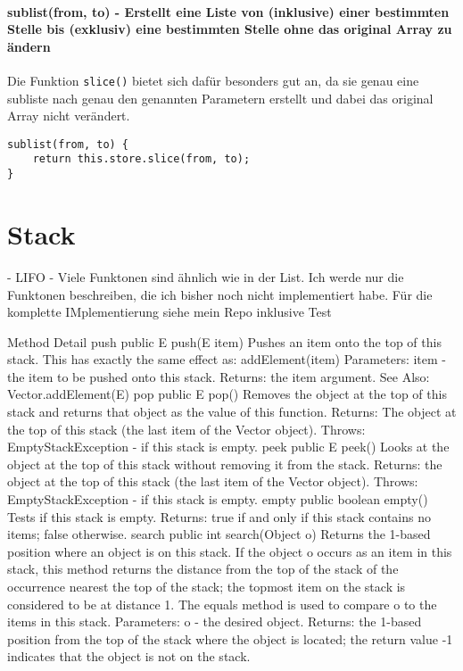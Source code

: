 \documentclass{book}
\begin{document}
\paragraph{sublist(from, to) - Erstellt eine Liste von (inklusive) einer bestimmten Stelle bis (exklusiv) eine bestimmten Stelle ohne das original Array zu ändern} Die Funktion \lstinline|slice()| bietet sich dafür besonders gut an, da sie genau eine subliste nach genau den genannten Parametern erstellt und dabei das original Array nicht verändert.
\begin{lstlisting}[caption=Array Konstruktor]
sublist(from, to) {
	return this.store.slice(from, to);
}

\end{lstlisting}
\section{Stack}
- LIFO
- Viele Funktonen sind ähnlich wie in der List. Ich werde nur die Funktonen beschreiben, die ich bisher noch nicht implementiert habe. Für die komplette IMplementierung siehe mein Repo inklusive Test

Method Detail
push
public E push(E item)
Pushes an item onto the top of this stack. This has exactly the same effect as:
addElement(item)
Parameters:
item - the item to be pushed onto this stack.
Returns:
the item argument.
See Also:
Vector.addElement(E)
pop
public E pop()
Removes the object at the top of this stack and returns that object as the value of this function.
Returns:
The object at the top of this stack (the last item of the Vector object).
Throws:
EmptyStackException - if this stack is empty.
peek
public E peek()
Looks at the object at the top of this stack without removing it from the stack.
Returns:
the object at the top of this stack (the last item of the Vector object).
Throws:
EmptyStackException - if this stack is empty.
empty
public boolean empty()
Tests if this stack is empty.
Returns:
true if and only if this stack contains no items; false otherwise.
search
public int search(Object o)
Returns the 1-based position where an object is on this stack. If the object o occurs as an item in this stack, this method returns the distance from the top of the stack of the occurrence nearest the top of the stack; the topmost item on the stack is considered to be at distance 1. The equals method is used to compare o to the items in this stack.
Parameters:
o - the desired object.
Returns:
the 1-based position from the top of the stack where the object is located; the return value -1 indicates that the object is not on the stack.
\end{document}
